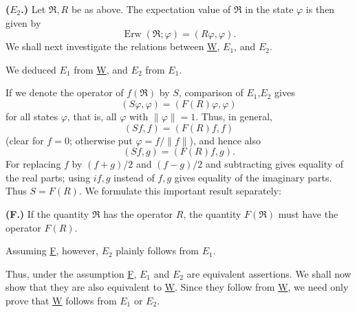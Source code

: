 \documentclass[fontsize=13pt,twoside,openany,headings=normal,parskip=false,bookmarkpackage=false,DIV=calc]{scrbook}
\begin{document}
\leavevmode{}\label{post:III.1.E2}\textbf{($E_2$.)} Let $\mathfrak R,R$ be as above. The expectation value of $\mathfrak R$ in the state $\varphi$ is then given by
\[
\operatorname{Erw}(\mathfrak R;\varphi)=(R\varphi,\varphi).
\]
We shall next investigate the relations between \hyperref[post:III.1.W]{W}, \hyperref[post:III.1.E1]{$E_1$}, and \hyperref[post:III.1.E2]{$E_2$}.
\hypertarget{origpage-106}{}%

We deduced \hyperref[post:III.1.E1]{$E_1$} from \hyperref[post:III.1.W]{W}, and \hyperref[post:III.1.E2]{$E_2$} from \hyperref[post:III.1.E1]{$E_1$}.

If we denote the operator of $f(\mathfrak R)$ by $S$, comparison of \hyperref[post:III.1.E1]{$E_1$},\hyperref[post:III.1.E2]{$E_2$} gives
\[
(S\varphi,\varphi)=(F(R)\varphi,\varphi)
\]
for all states $\varphi$, that is, all $\varphi$ with $\|\varphi\|=1$. Thus, in general,
\[
(Sf,f)=(F(R)f,f)
\]
(clear for $f=0$; otherwise put $\varphi=f/\|f\|$), and hence also
\[
(Sf,g)=(F(R)f,g).
\]
For replacing $f$ by $(f+g)/2$ and $(f-g)/2$ and subtracting gives equality of the real parts; using $if,g$ instead of $f,g$ gives equality of the imaginary parts. Thus $S=F(R)$. We formulate this important result separately:

\leavevmode{}\label{post:III.1.F}\textbf{(F.)} If the quantity $\mathfrak R$ has the operator $R$, the quantity $F(\mathfrak R)$ must have the operator $F(R)$.

Assuming \hyperref[post:III.1.F]{F}, however, \hyperref[post:III.1.E2]{$E_2$} plainly follows from \hyperref[post:III.1.E1]{$E_1$}.

Thus, under the assumption \hyperref[post:III.1.F]{F}, \hyperref[post:III.1.E1]{$E_1$} and \hyperref[post:III.1.E2]{$E_2$} are equivalent assertions. We shall now show that they are also equivalent to \hyperref[post:III.1.W]{W}. Since they follow from \hyperref[post:III.1.W]{W}, we need only prove that \hyperref[post:III.1.W]{W} follows from \hyperref[post:III.1.E1]{$E_1$} or \hyperref[post:III.1.E2]{$E_2$}.
\end{document}
